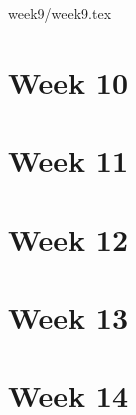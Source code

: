 \documentclass[a4paper]{book}
\begin{document}
{week9/week9.tex}

\chapter{Week 10}



\chapter{Week 11}



\chapter{Week 12}



\chapter{Week 13}



\chapter{Week 14}
\end{document}
